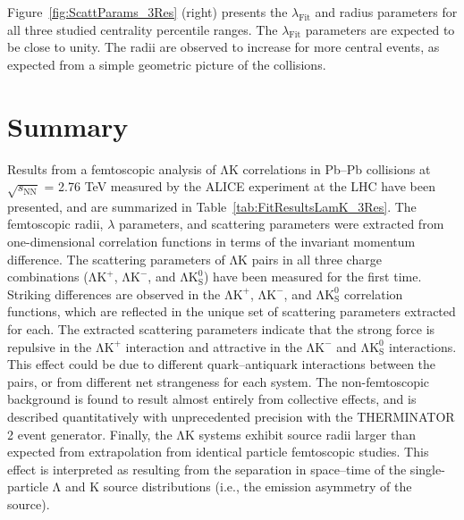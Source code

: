 \documentclass{svproc}
\newcommand{\ResultsDirBaseLamKch}{/home/jesse/Analysis/FemtoAnalysis/Results/Results_cLamcKch_20190319/}
\newcommand{\MomRes}{_MomResCrctn}%
\newcommand{\NonFlatBgdLamKch}{_NonFlatBgdCrctnLamK0LamKchPolynomial}
\newcommand{\ResNum}{_3Res}
\newcommand{\PrimMaxDecay}{_PrimMaxDecay10fm}
\newcommand{\ResMethod}{_UsingXiDataAndCoulombOnly}
\newcommand{\ParamFixAndShareLamKch}{_ShareLam_Dualie_ShareLam_ShareRadii}
\newcommand{\SaveNameModLamKch}{\MomRes\NonFlatBgdLamKch\ResNum\PrimMaxDecay\ResMethod\ParamFixAndShareLamKch}
\newcommand{\Lam}{$\mathrm{\Lambda}$\xspace}
\newcommand{\LamK}{$\mathrm{\Lambda}\mathrm{K}$\xspace}
\newcommand{\LamKchP}{$\mathrm{\Lambda}\mathrm{K^{+}}$\xspace}
\newcommand{\LamKchM}{$\mathrm{\Lambda}\mathrm{K^{-}}$\xspace}
\newcommand{\LamKs}{$\mathrm{\Lambda}\mathrm{K^{0}_{S}}$\xspace}
\begin{document}
Figure~\ref{fig:ScattParams_3Res} (right) presents the $\lambda_{\mathrm{Fit}}$ and radius parameters for all three studied centrality percentile ranges.
The $\lambda_{\mathrm{Fit}}$ parameters are expected to be close to unity. 
The radii are observed to increase for more central events, as expected from a simple geometric picture of the collisions.


\section{Summary}
\label{sec:Summary}



Results from a femtoscopic analysis of \LamK correlations in Pb--Pb collisions at $\sqrt{s_{\mathrm{NN}}}$ = 2.76 TeV measured by the ALICE experiment at the LHC have been presented, and are summarized in Table~\ref{tab:FitResultsLamK_3Res}.
The femtoscopic radii, $\lambda$ parameters, and scattering parameters were extracted from one-dimensional correlation functions in terms of the invariant momentum difference.
The scattering parameters of \LamK pairs in all three charge combinations (\LamKchP, \LamKchM, and \LamKs) have been measured for the first time.
Striking differences are observed in the \LamKchP, \LamKchM, and \LamKs correlation functions, which are reflected in the unique set of scattering parameters extracted for each.
The extracted scattering parameters indicate that the strong force is repulsive in the \LamKchP interaction and attractive in the \LamKchM and \LamKs interactions.
This effect could be due to different quark--antiquark interactions between the pairs, or from different net strangeness for each system. 
The non-femtoscopic background is found to result almost entirely from collective effects, and is described quantitatively with unprecedented precision with the THERMINATOR 2 event generator.
Finally, the \LamK systems exhibit source radii larger than expected from extrapolation from identical particle femtoscopic studies.
This effect is interpreted as resulting from the separation in space--time of the single-particle \Lam and K source distributions (i.e., the emission asymmetry of the source).
\end{document}
